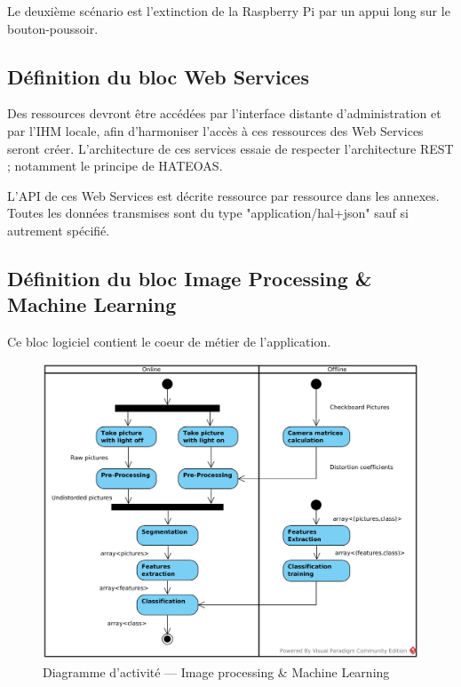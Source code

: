 Le deuxième scénario est l'extinction de la Raspberry Pi par un appui long sur le bouton-poussoir.



\subsection{Définition du bloc Web Services}
\label{sub:DefWebServices}

Des ressources devront être accédées par l'interface distante d'administration et par l'IHM locale, afin d'harmoniser l'accès à ces ressources des Web Services seront créer.
L'architecture de ces services essaie de respecter l'architecture REST ; notamment le principe de HATEOAS.

L'API de ces Web Services est décrite ressource par ressource dans les annexes.
Toutes les données transmises sont du type "application/hal+json" sauf si autrement spécifié.


\subsection{Définition du bloc Image Processing \& Machine Learning}
\label{sub:DefCVML}

Ce bloc logiciel contient le coeur de métier de l'application.


\begin{figure}[H]
    \centering
    \includegraphics[scale=0.75]{img/SysML_CVML_AD.png}
    \caption{Diagramme d'activité --- Image processing \& Machine Learning}
    \label{CVMLAD}
\end{figure}

